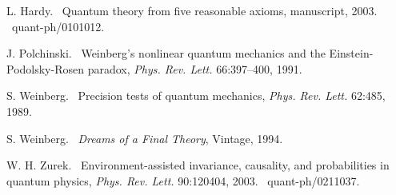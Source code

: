\documentclass{article}%
\begin{document}
\begin{thebibliography}{9}
L. Hardy. \ Quantum theory from five reasonable axioms,
manuscript, 2003. \ quant-ph/0101012.

J. Polchinski. \ Weinberg's nonlinear quantum mechanics
and the Einstein-Podolsky-Rosen paradox, \textit{Phys. Rev. Lett.}
66:397--400, 1991.

S. Weinberg. \ Precision tests of quantum mechanics,
\textit{Phys. Rev. Lett.} 62:485, 1989.

S. Weinberg. \ \textit{Dreams of a Final Theory}, Vintage, 1994.

W. H. Zurek. \ Environment-assisted invariance, causality, and
probabilities in quantum physics, \textit{Phys. Rev. Lett.} 90:120404, 2003. \ quant-ph/0211037.
\end{thebibliography}
\end{document}
